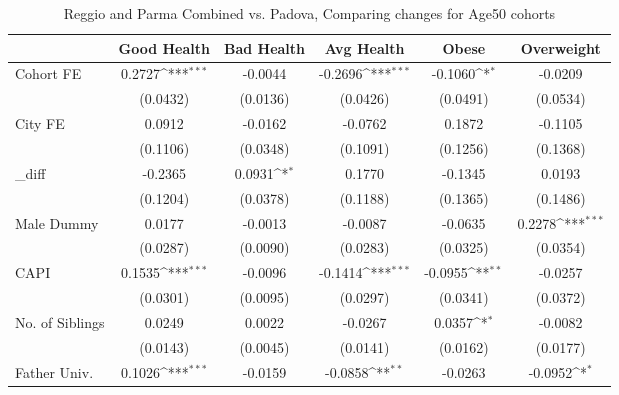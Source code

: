\begin{table}[htbp]\centering
\def\sym#1{\ifmmode^{#1}\else\(^{#1}\)\fi}
\caption{Reggio and Parma Combined vs. Padova, Comparing changes for Age50 cohorts}
\begin{tabular}{l*{5}{c}}
\toprule
            &\multicolumn{1}{c}{Good Health}&\multicolumn{1}{c}{Bad Health}&\multicolumn{1}{c}{Avg Health}&\multicolumn{1}{c}{Obese}&\multicolumn{1}{c}{Overweight}\\
\midrule
Cohort FE   &      0.2727\sym{***}&     -0.0044         &     -0.2696\sym{***}&     -0.1060\sym{*}  &     -0.0209         \\
            &    (0.0432)         &    (0.0136)         &    (0.0426)         &    (0.0491)         &    (0.0534)         \\
\addlinespace
City FE     &      0.0912         &     -0.0162         &     -0.0762         &      0.1872         &     -0.1105         \\
            &    (0.1106)         &    (0.0348)         &    (0.1091)         &    (0.1256)         &    (0.1368)         \\
\addlinespace
\_diff       &     -0.2365         &      0.0931\sym{*}  &      0.1770         &     -0.1345         &      0.0193         \\
            &    (0.1204)         &    (0.0378)         &    (0.1188)         &    (0.1365)         &    (0.1486)         \\
\addlinespace
Male Dummy  &      0.0177         &     -0.0013         &     -0.0087         &     -0.0635         &      0.2278\sym{***}\\
            &    (0.0287)         &    (0.0090)         &    (0.0283)         &    (0.0325)         &    (0.0354)         \\
\addlinespace
CAPI        &      0.1535\sym{***}&     -0.0096         &     -0.1414\sym{***}&     -0.0955\sym{**} &     -0.0257         \\
            &    (0.0301)         &    (0.0095)         &    (0.0297)         &    (0.0341)         &    (0.0372)         \\
\addlinespace
No. of Siblings&      0.0249         &      0.0022         &     -0.0267         &      0.0357\sym{*}  &     -0.0082         \\
            &    (0.0143)         &    (0.0045)         &    (0.0141)         &    (0.0162)         &    (0.0177)         \\
\addlinespace
Father Univ.&      0.1026\sym{***}&     -0.0159         &     -0.0858\sym{**} &     -0.0263         &     -0.0952\sym{*}  \\

\end{tabular}
\end{table}
